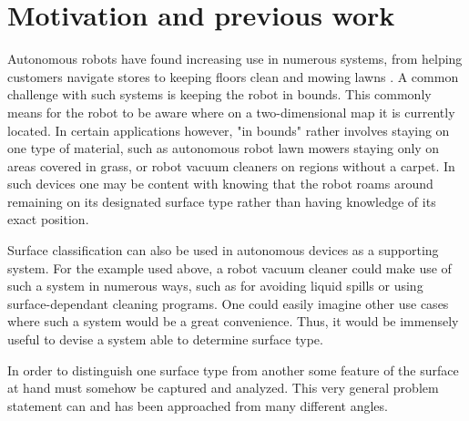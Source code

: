 \section{Motivation and previous work}

Autonomous robots have found increasing use in numerous systems, from helping customers navigate stores \citep{mcsweeney_2018} to keeping floors clean \citep{ifr_press_release_2016} and mowing lawns \citep{udelhofen_2018}. A common challenge with such systems is keeping the robot in bounds. This commonly means for the robot to be aware where on a two-dimensional map it is currently located. In certain applications however, "in bounds" rather involves staying on one type of material, such as autonomous robot lawn mowers staying only on areas covered in grass, or robot vacuum cleaners on regions without a carpet. In such devices one may be content with knowing that the robot roams around remaining on its designated surface type rather than having knowledge of its exact position. 

Surface classification can also be used in autonomous devices as a supporting system. For the example used above, a robot vacuum cleaner could make use of such a system in numerous ways, such as for avoiding liquid spills or using surface-dependant cleaning programs. One could easily imagine other use cases where such a system would be a great convenience. Thus, it would be immensely useful to devise a system able to determine surface type. 

In order to distinguish one surface type from another some feature of the surface at hand must somehow be captured and analyzed. This very general problem statement can and has been approached from many different angles.

